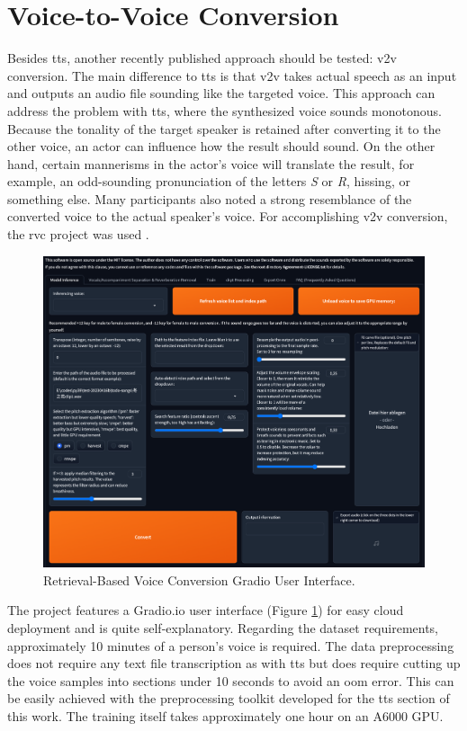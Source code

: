 \documentclass[
  a4paper,  %
  twoside,  %
  bibliography=totoc,
  headsepline,
  cleardoublepage=empty,
  parskip=half,
  draft=false
]{scrbook}
\begin{document}
\section{Voice-to-Voice Conversion}
\label{sec:v2v}
Besides \gls{tts}, another recently published approach should be tested: \gls{v2v} conversion. The main difference to \gls{tts} is that \gls{v2v} takes actual speech as an input and outputs an audio file sounding like the targeted voice. This approach can address the problem with \gls{tts}, where the synthesized voice sounds monotonous. Because the tonality of the target speaker is retained after converting it to the other voice, an actor can influence how the result should sound. On the other hand, certain mannerisms in the actor's voice will translate the result, for example, an odd-sounding pronunciation of the letters \textit{S} or \textit{R}, hissing, or something else. Many participants also noted a strong resemblance of the converted voice to the actual speaker's voice. For accomplishing \gls{v2v} conversion, the \gls{rvc} project was used \cite{RVCProjectRetrievalbasedVoiceConversionWebUI2023}. 

\begin{figure}[h]
  \centering
  \includegraphics[width=1\textwidth]{./graphics/RVC-UI.png}
  \caption{Retrieval-Based Voice Conversion Gradio User Interface.}
  \label{fig:rvc-gradio}
\end{figure}

The project features a Gradio.io user interface (Figure \ref{fig:rvc-gradio}) for easy cloud deployment and is quite self-explanatory. Regarding the dataset requirements, approximately 10 minutes of a person's voice is required. The data preprocessing does not require any text file transcription as with \gls{tts} but does require cutting up the voice samples into sections under 10 seconds to avoid an \gls{oom} error. This can be easily achieved with the preprocessing toolkit developed for the \gls{tts} section of this work. The training itself takes approximately one hour on an A6000 GPU.
\end{document}
